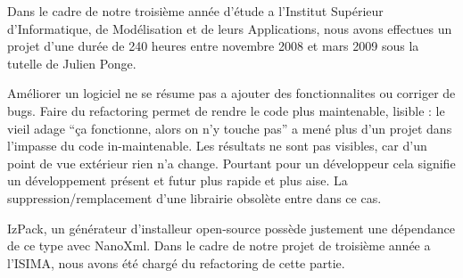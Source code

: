     Dans le cadre de notre troisième année d'étude a l'Institut Supérieur d'Informatique, de Modélisation et de leurs
Applications, nous avons effectues un projet d'une durée de 240 heures entre novembre 2008 et mars 2009 sous la
tutelle de Julien Ponge.

Améliorer un logiciel ne se résume pas a ajouter des fonctionnalites ou corriger de bugs. Faire du refactoring permet de rendre le code plus maintenable, lisible : le vieil adage ``ça fonctionne, alors on n'y touche pas'' a mené plus d'un projet dans l'impasse du code in-maintenable. Les résultats ne sont pas visibles, car d'un point de vue extérieur rien n'a change. Pourtant pour un développeur cela signifie un développement présent et futur plus rapide et plus aise. La suppression/remplacement d'une librairie obsolète entre dans ce cas.

IzPack, un générateur d'installeur open-source possède justement une dépendance de ce type avec NanoXml. Dans le cadre de notre projet de troisième année a l'ISIMA, nous avons été chargé du refactoring de cette partie.
